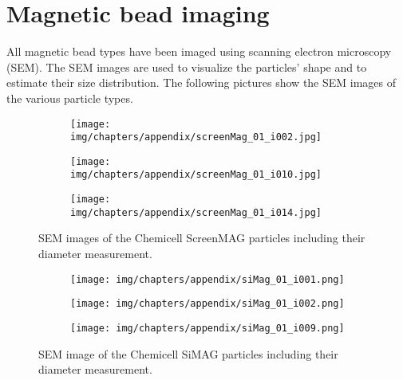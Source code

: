 \cleardoublepage

\chapter{Magnetic bead imaging}\label{sec:magneticBeadImaging}
All magnetic bead types have been imaged using scanning electron microscopy (SEM). The SEM images are used to visualize the particles' shape and to estimate their size distribution. The following pictures show the SEM images of the various particle types.

\begin{figure}[htb]
	\centering
    \begin{subfigure}[b]{0.48\textwidth}
		\texttt{[image: img/chapters/appendix/screenMag\_01\_i002.jpg]}
        \caption{}
	\end{subfigure}
    \hfill
	\begin{subfigure}[b]{0.48\textwidth}
    	\texttt{[image: img/chapters/appendix/screenMag\_01\_i010.jpg]}
    	\caption{}
    \end{subfigure}
	\hfill
	\begin{subfigure}[b]{0.48\textwidth}
		\texttt{[image: img/chapters/appendix/screenMag\_01\_i014.jpg]}
		\caption{}
	\end{subfigure}
	\caption[SEM images for Chemicell ScreenMAG particles including measurements]{SEM images of the Chemicell ScreenMAG particles including their diameter measurement.}
\label{fig:}
\end{figure}

\begin{figure}[htb]
	\centering
	\begin{subfigure}[b]{0.48\textwidth}
		\texttt{[image: img/chapters/appendix/siMag\_01\_i001.png]}
		\caption{}
	\end{subfigure}
	\hfill
	\begin{subfigure}[b]{0.48\textwidth}
		\texttt{[image: img/chapters/appendix/siMag\_01\_i002.png]}
		\caption{}
	\end{subfigure}
	\hfill
	\begin{subfigure}[b]{0.48\textwidth}
		\texttt{[image: img/chapters/appendix/siMag\_01\_i009.png]}
		\caption{}
	\end{subfigure}
	\caption[SEM image for Chemicell SiMAG particles including measuremen]{SEM image of the Chemicell SiMAG particles including their diameter measurement.}
\end{figure}

